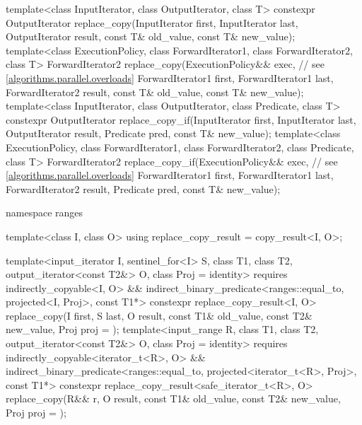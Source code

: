 \begin{codeblock}
{  template<class InputIterator, class OutputIterator, class T>
    constexpr OutputIterator replace_copy(InputIterator first, InputIterator last,
                                          OutputIterator result,
                                          const T& old_value, const T& new_value);
  template<class ExecutionPolicy, class ForwardIterator1, class ForwardIterator2, class T>
    ForwardIterator2 replace_copy(ExecutionPolicy&& exec,       // see \ref{algorithms.parallel.overloads}
                                  ForwardIterator1 first, ForwardIterator1 last,
                                  ForwardIterator2 result,
                                  const T& old_value, const T& new_value);
  template<class InputIterator, class OutputIterator, class Predicate, class T>
    constexpr OutputIterator replace_copy_if(InputIterator first, InputIterator last,
                                             OutputIterator result,
                                             Predicate pred, const T& new_value);
  template<class ExecutionPolicy, class ForwardIterator1, class ForwardIterator2,
           class Predicate, class T>
    ForwardIterator2 replace_copy_if(ExecutionPolicy&& exec,    // see \ref{algorithms.parallel.overloads}
                                     ForwardIterator1 first, ForwardIterator1 last,
                                     ForwardIterator2 result,
                                     Predicate pred, const T& new_value);

  namespace ranges {
    template<class I, class O>
    using replace_copy_result = copy_result<I, O>;

    template<input_iterator I, sentinel_for<I> S, class T1, class T2,
             output_iterator<const T2&> O, class Proj = identity>
      requires indirectly_copyable<I, O> &&
               indirect_binary_predicate<ranges::equal_to, projected<I, Proj>, const T1*>
      constexpr replace_copy_result<I, O>
        replace_copy(I first, S last, O result, const T1& old_value, const T2& new_value,
                     Proj proj = {});
    template<input_range R, class T1, class T2, output_iterator<const T2&> O,
             class Proj = identity>
      requires indirectly_copyable<iterator_t<R>, O> &&
               indirect_binary_predicate<ranges::equal_to,
                                         projected<iterator_t<R>, Proj>, const T1*>
      constexpr replace_copy_result<safe_iterator_t<R>, O>
        replace_copy(R&& r, O result, const T1& old_value, const T2& new_value,
                     Proj proj = {});

}}
\end{codeblock}
